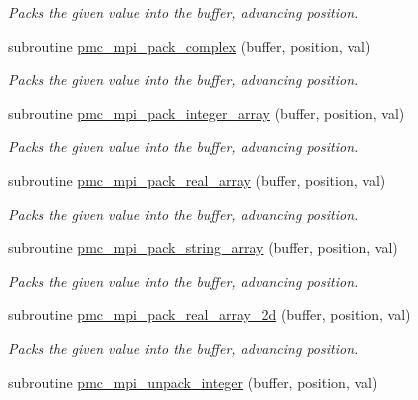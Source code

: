 \begin{DoxyCompactItemize}
\begin{DoxyCompactList}\small\item\em Packs the given value into the buffer, advancing position. \end{DoxyCompactList}\item 
subroutine \mbox{\hyperlink{namespacepmc__mpi_a5a62099ffca12da0a704c7882eae5a68}{pmc\+\_\+mpi\+\_\+pack\+\_\+complex}} (buffer, position, val)
\begin{DoxyCompactList}\small\item\em Packs the given value into the buffer, advancing position. \end{DoxyCompactList}\item 
subroutine \mbox{\hyperlink{namespacepmc__mpi_a79337d426f7bb79e202bef5fa947399e}{pmc\+\_\+mpi\+\_\+pack\+\_\+integer\+\_\+array}} (buffer, position, val)
\begin{DoxyCompactList}\small\item\em Packs the given value into the buffer, advancing position. \end{DoxyCompactList}\item 
subroutine \mbox{\hyperlink{namespacepmc__mpi_a1f4e3e18f2df01bd7b78fa8451ee5b71}{pmc\+\_\+mpi\+\_\+pack\+\_\+real\+\_\+array}} (buffer, position, val)
\begin{DoxyCompactList}\small\item\em Packs the given value into the buffer, advancing position. \end{DoxyCompactList}\item 
subroutine \mbox{\hyperlink{namespacepmc__mpi_a6516aa6e9b139d7650cafce697c4caa8}{pmc\+\_\+mpi\+\_\+pack\+\_\+string\+\_\+array}} (buffer, position, val)
\begin{DoxyCompactList}\small\item\em Packs the given value into the buffer, advancing position. \end{DoxyCompactList}\item 
subroutine \mbox{\hyperlink{namespacepmc__mpi_a505ef0d99feec94b21ea8b3f0011796d}{pmc\+\_\+mpi\+\_\+pack\+\_\+real\+\_\+array\+\_\+2d}} (buffer, position, val)
\begin{DoxyCompactList}\small\item\em Packs the given value into the buffer, advancing position. \end{DoxyCompactList}\item 
subroutine \mbox{\hyperlink{namespacepmc__mpi_abc0278c39a8266c36d75d5801f4d8cf2}{pmc\+\_\+mpi\+\_\+unpack\+\_\+integer}} (buffer, position, val)

\end{DoxyCompactItemize}
